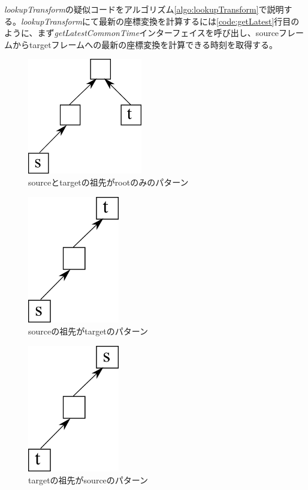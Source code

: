 \documentclass[a4paper]{jreport}	%
\begin{document}
\textit{lookupTransform}の疑似コードをアルゴリズム\ref{algo:lookupTransform}で説明する。\textit{lookupTransform}にて最新の座標変換を計算するには\ref{code:getLatest}行目のように、まず\textit{getLatestCommonTime}インターフェイスを呼び出し、sourceフレームからtargetフレームへの最新の座標変換を計算できる時刻を取得する。

\begin{figure}[h] 
\centering
\includegraphics[width=5cm]{same-root}	
\caption{sourceとtargetの祖先がrootのみのパターン}
\label{fig:same-root}
\end{figure}

\begin{figure}[h] 
\centering
\includegraphics[width=4cm]{s-t}	
\caption{sourceの祖先がtargetのパターン}
\label{fig:s-t}
\end{figure}

\begin{figure}[h] 
\centering
\includegraphics[width=4cm]{t-s}	
\caption{targetの祖先がsourceのパターン}
\label{fig:t-s}
\end{figure}
\end{document}
